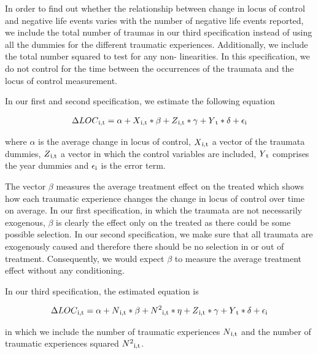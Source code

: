 \documentclass[12pt, a4paper, fleqn, parskip]{scrartcl}
\begin{document}
In order to find out whether the relationship between change in locus of
control and negative life events varies with the number of negative life events
reported, we include the total number of traumas in our third specification
instead of using all the dummies for the different traumatic experiences.
Additionally, we include the total number squared to test for any non-
linearities. In this specification, we do not control for the time between the
occurrences of the traumata and the locus of control measurement.

In our first and second specification, we estimate the following equation

\begin{align}
	\Delta LOC \textsubscript{i,t}= \alpha + X \textsubscript{i,t} * \beta + Z
	\textsubscript{i,t} * \gamma + Y\textsubscript{t} * \delta +
	\epsilon\textsubscript{i}
\end{align}

where $\alpha$ is the average change in locus of control, $
X\textsubscript{i,t}$ a vector of the traumata dummies, $ Z\textsubscript{i,t}$
a vector in which the control variables are included, $ Y\textsubscript{t}$
comprises the year dummies and $\epsilon\textsubscript{i}$ is the error term.

The vector $\beta$ measures the average treatment effect on the treated which
shows how each traumatic experience changes the change in locus of control over
time on average. In our first specification, in which the traumata are not
necessarily exogenous, $\beta $ is clearly the effect only on the treated as
there could be some possible selection. In our second specification, we make
sure that all traumata are exogenously caused and therefore there should be no
selection in or out of treatment. Consequently, we would expect $\beta$ to
measure the average treatment effect without any conditioning.

In our third specification, the estimated equation is

\begin{align}
	\Delta LOC \textsubscript{i,t}= \alpha + N \textsubscript{i,t} * \beta + N
	\textsuperscript{2}\textsubscript{i,t} * \eta + Z \textsubscript{i,t} *
	\gamma + Y\textsubscript{t} * \delta + \epsilon\textsubscript{i}
\end{align}

in which we include the number of traumatic experiences $N \textsubscript{i,t}$
and the number of traumatic experiences squared $N
\textsuperscript{2}\textsubscript{i,t}$.
\end{document}
